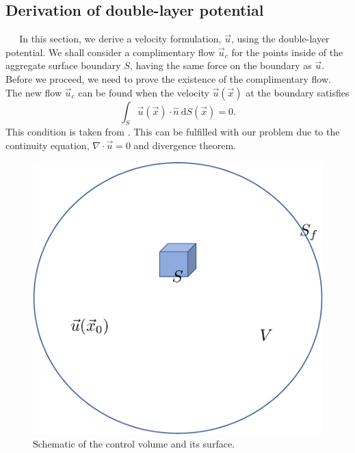 \subsection{Derivation of double-layer potential}
$\ \ \ \ \ $ 
In this section, we derive a velocity formulation, $\vec{u}$, using the double-layer potential. We shall consider a complimentary flow $\vec{u}_c$ 
for the points inside of the aggregate surface boundary $S$, having the same force on the boundary as $\vec{u}$. Before we proceed, we need to prove the existence of the complimentary flow.
The new flow $\vec{u}_c$ can be found when the velocity $\vec{u}(\vec{x})$ at the boundary satisfies
\begin{equation}
 	\int_S \vec{u}(\vec{x}) \cdot \hat{n} \ \text{d}S(\vec{x})=0. 
	\label{eq_dlp_constraint}
\end{equation}
This condition is taken from \cite{pozrikidis_boundary_1992}.
This can be fulfilled with our problem due to the continuity equation, $\nabla \cdot \vec{u}= 0$ and divergence theorem.
\begin{figure}[h]
	\begin{center}
		\includegraphics[scale=0.4]{./figures/fig_dlp_volume}
		\vspace{0.5cm}
	\caption{Schematic of the control volume and its surface.}
	\label{fig_dlp_volume}
\end{center}
\end{figure}

